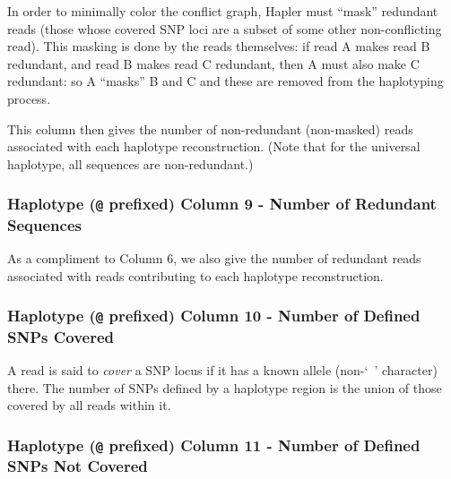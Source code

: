 \documentclass[11pt]{llncs}
\begin{document}
In order to minimally color the conflict graph, Hapler must ``mask'' redundant reads (those whose covered SNP loci are a subset of some other 
non-conflicting read). This masking is done by the reads themselves: if read A makes read B redundant, and read B makes read C redundant,
then A must also make C redundant: so A ``masks'' B and C and these are removed from the haplotyping process.

This column then gives the number of non-redundant (non-masked) reads associated with each haplotype reconstruction. (Note that for the universal
haplotype, all sequences are non-redundant.)

\subsubsection{Haplotype (\texttt{@} prefixed) Column 9 - Number of Redundant Sequences}

As a compliment to Column 6, we also give the number of redundant reads associated with reads contributing to each haplotype reconstruction.

\subsubsection{Haplotype (\texttt{@} prefixed) Column 10 - Number of Defined SNPs Covered}

A read is said to \emph{cover} a SNP locus if it has a known allele (non-`~' character) there. The number of SNPs defined by a haplotype region
is the union of those covered by all reads within it.




\subsubsection{Haplotype (\texttt{@} prefixed) Column 11 - Number of Defined SNPs Not Covered}
\end{document}
